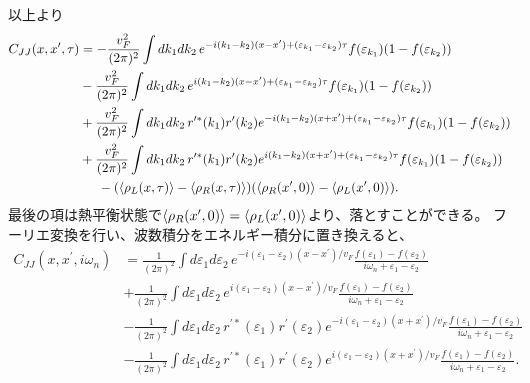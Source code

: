 \documentclass[10pt,a4j]{jarticle}
\begin{document}
以上より
\begin{align}
C_{JJ}(x,x^\prime,\tau) &=   - \frac{v_F^2}{(2\pi)^2} \int dk_1 dk_2 \, 
e^{-i(k_1-k_2)(x-x^\prime) + (\varepsilon_{k_1} - \varepsilon_{k_2})\tau}
f(\varepsilon_{k_1})(1 - f(\varepsilon_{k_2})) \nonumber \\
& -  \frac{v_F^2}{(2\pi)^2} \int dk_1 dk_2 \, 
e^{i(k_1-k_2)(x-x^\prime) + (\varepsilon_{k_1} - \varepsilon_{k_2})\tau}
f(\varepsilon_{k_1})(1 - f(\varepsilon_{k_2})) \nonumber \\
&+ \frac{v_F^2}{(2\pi)^2} \int dk_1 dk_2 \, r^{\prime*}(k_1)r^\prime(k_2) 
e^{-i(k_1-k_2)(x+x^\prime) + (\varepsilon_{k_1} - \varepsilon_{k_2})\tau}
f(\varepsilon_{k_1})(1 - f(\varepsilon_{k_2})) \nonumber \\
& + \frac{v_F^2}{(2\pi)^2} \int dk_1 dk_2 \, r^{\prime*}(k_1)r^\prime(k_2) 
e^{i(k_1-k_2)(x+x^\prime) + (\varepsilon_{k_1} - \varepsilon_{k_2})\tau}
f(\varepsilon_{k_1})(1 - f(\varepsilon_{k_2})) \nonumber \\
& \hspace{5mm} - (\braket{\rho_{L}(x,\tau)}-\braket{\rho_{R}(x,\tau)} )( \braket{ \rho_{R}(x^\prime,0)} - \braket{ \rho_{L}(x^\prime,0)} ) .
\end{align}
最後の項は熱平衡状態で$\braket{\rho_{R}(x^\prime,0)} = \braket{ \rho_{L}(x^\prime,0)}$より、落とすことができる。
フーリエ変換を行い、波数積分をエネルギー積分に置き換えると、
\begin{align}
C_{JJ}(x,x^\prime,i\omega_n) &=   \frac{1}{(2\pi)^2} \int d\varepsilon_1 d\varepsilon_2 \, 
e^{-i(\varepsilon_1-\varepsilon_2)(x-x^\prime)/v_F}
\frac{f(\varepsilon_1)- f(\varepsilon_2)}{i\omega_n + \varepsilon_1 - \varepsilon_2} \nonumber \\
& + \frac{1}{(2\pi)^2} \int d\varepsilon_1 d\varepsilon_2 \, 
e^{i(\varepsilon_1-\varepsilon_2)(x-x^\prime)/v_F }
\frac{f(\varepsilon_1)- f(\varepsilon_2)}{i\omega_n + \varepsilon_1 - \varepsilon_2} 
\nonumber \\
&- \frac{1}{(2\pi)^2} \int d\varepsilon_1 d\varepsilon_2 \, r^{\prime*}(\varepsilon_1)r^\prime(\varepsilon_2) 
e^{-i(\varepsilon_1-\varepsilon_2)(x+x^\prime)/v_F}
\frac{f(\varepsilon_1)- f(\varepsilon_2)}{i\omega_n + \varepsilon_1 - \varepsilon_2} \nonumber \\
& -\frac{1}{(2\pi)^2} \int d\varepsilon_1 d\varepsilon_2 \, r^{\prime*}(\varepsilon_1)r^\prime(\varepsilon_2) 
e^{i(\varepsilon_1-\varepsilon_2)(x+x^\prime)/v_F }
\frac{f(\varepsilon_1)- f(\varepsilon_2)}{i\omega_n + \varepsilon_1 - \varepsilon_2} .
\end{align}
\end{document}
